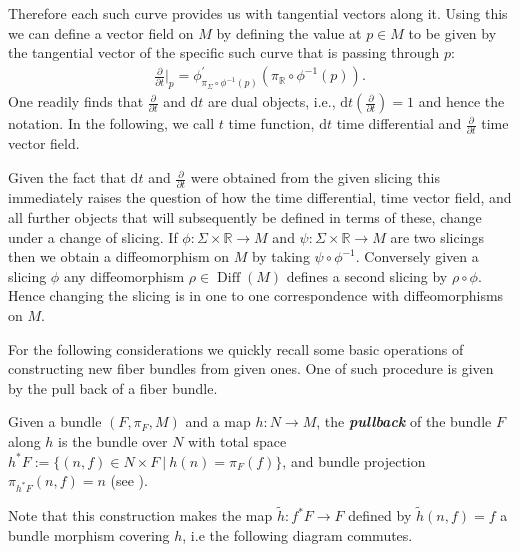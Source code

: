 Therefore each such curve provides us with tangential vectors along it. Using this we can define a vector field on $M$ by defining the value at $p \in M$ to be given by the tangential vector of the specific such curve that is passing through $p$:
\begin{align}
\frac{\partial}{\partial t}\bigg \vert_p = \phi^{\prime}_{\pi_{\Sigma}\circ \phi^{-1}(p)} \left (\pi_{\mathbb{R}}\circ \phi^{-1}(p)\right ).
\end{align}
One readily finds that $\frac{\partial}{\partial t}$ and $\mathrm{d}t$ are dual objects, i.e., $\mathrm{d}t(\frac{\partial}{\partial t}) = 1$ and hence the notation. In the following, we call $t$ time function, $\mathrm{d}t$ time differential and $\frac{\partial}{\partial t}$ time vector field.


Given the fact that $\mathrm{d}t$ and $\frac{\partial}{\partial t}$ were obtained from the given slicing this immediately raises the question of how the time differential, time vector field, and all further objects that will subsequently be defined in terms of these, change under a change of slicing. If $\phi : \Sigma \times \mathbb{R} \rightarrow M $ and $\psi : \Sigma \times \mathbb{R} \rightarrow M$ are two slicings then we obtain a diffeomorphism on $M$ by taking $\psi \circ \phi^{-1}$. Conversely given a slicing $\phi$ any diffeomorphism $\rho \in \operatorname{Diff}(M)$ defines a second slicing by $\rho \circ \phi $. Hence changing the slicing is in one to one correspondence with diffeomorphisms on $M$. 

For the following considerations we quickly recall some basic operations of constructing new fiber bundles from given ones. One of such procedure is given by the pull back of a fiber bundle.
\begin{definition}
Given a bundle $(F,\pi_F,M)$ and a map $h: N \rightarrow M$, the \textit{\textbf{pullback}} of the bundle $F$ along $h$ is the bundle over $N$ with total space $h^{\ast}F := \{ (n,f) \in N \times F \ \vert \  h(n) = \pi_F(f)\}$, and bundle projection $\pi_{h^{\ast}F}(n,f) = n$ (see \cite{doi:10.1142/3867}).
\end{definition}
\begin{remark}
Note that this construction makes the map $\tilde{h}: f^{\ast}F \rightarrow F$ defined by $\tilde{h}(n,f) = f$ a bundle morphism covering $h$, i.e the following diagram commutes. 
\begin{center}
\end{center}
\end{remark}

